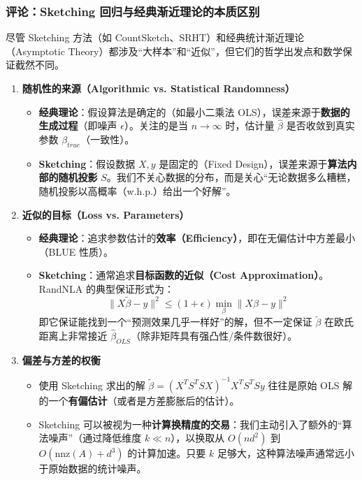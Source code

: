\documentclass[11pt,a4paper]{ctexart}
\theoremstyle{definition}
\theoremstyle{remark}
\begin{document}
\subsubsection*{评论：Sketching 回归与经典渐近理论的本质区别}

尽管 Sketching 方法（如 CountSketch、SRHT）和经典统计渐近理论（Asymptotic Theory）都涉及“大样本”和“近似”，但它们的哲学出发点和数学保证截然不同。

\begin{enumerate}
    \item \textbf{随机性的来源（Algorithmic vs. Statistical Randomness）}
    \begin{itemize}
        \item \textbf{经典理论}：假设算法是确定的（如最小二乘法 OLS），误差来源于\textbf{数据的生成过程}（即噪声 $\epsilon$）。关注的是当 $n \to \infty$ 时，估计量 $\hat{\beta}$ 是否收敛到真实参数 $\beta_{true}$（一致性）。
        \item \textbf{Sketching}：假设数据 $X, y$ 是固定的（Fixed Design），误差来源于\textbf{算法内部的随机投影} $S$。我们不关心数据的分布，而是关心“无论数据多么糟糕，随机投影以高概率（w.h.p.）给出一个好解”。
    \end{itemize}

    \item \textbf{近似的目标（Loss vs. Parameters）}
    \begin{itemize}
        \item \textbf{经典理论}：追求参数估计的\textbf{效率（Efficiency）}，即在无偏估计中方差最小（BLUE 性质）。
        \item \textbf{Sketching}：通常追求\textbf{目标函数的近似（Cost Approximation）}。RandNLA 的典型保证形式为：
        \[
        \|X \tilde{\beta} - y\|^2 \leq (1+\epsilon) \min_{\beta} \|X\beta - y\|^2
        \]
        即它保证能找到一个“预测效果几乎一样好”的解，但不一定保证 $\tilde{\beta}$ 在欧氏距离上非常接近 $\hat{\beta}_{OLS}$（除非矩阵具有强凸性/条件数很好）。
    \end{itemize}

    \item \textbf{偏差与方差的权衡}
    \begin{itemize}
        \item 使用 Sketching 求出的解 $\tilde{\beta} = (X^T S^T S X)^{-1} X^T S^T S y$ 往往是原始 OLS 解的一个\textbf{有偏估计}（或者是方差膨胀后的估计）。
        \item Sketching 可以被视为一种\textbf{计算换精度的交易}：我们主动引入了额外的“算法噪声”（通过降低维度 $k \ll n$），以换取从 $O(nd^2)$ 到 $O(\text{nnz}(A) + d^3)$ 的计算加速。只要 $k$ 足够大，这种算法噪声通常远小于原始数据的统计噪声。
    \end{itemize}
\end{enumerate}
\end{document}
